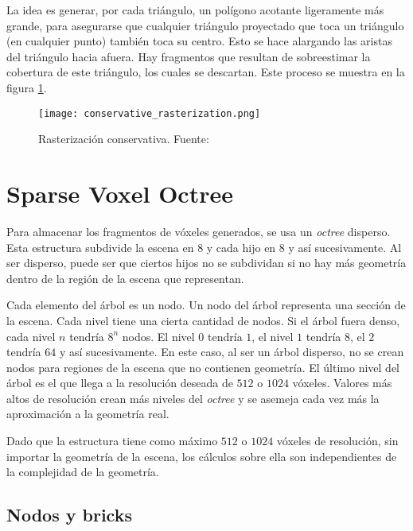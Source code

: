 La idea es generar, por cada triángulo, un polígono acotante ligeramente más grande, para asegurarse que cualquier triángulo proyectado que toca un triángulo (en cualquier punto) también toca su centro. %
Esto se hace alargando las aristas del triángulo hacia afuera.
Hay fragmentos que resultan de sobreestimar la cobertura de este triángulo, los cuales se descartan.
Este proceso se muestra en la figura \ref{fig:conservative_rasterization}.

\begin{figure}[h!]
    \centering
    \texttt{[image: conservative\_rasterization.png]}
    \caption{Rasterización conservativa. Fuente: \cite{opengl-insights}}
    \label{fig:conservative_rasterization}
\end{figure}

\section{Sparse Voxel Octree}

Para almacenar los fragmentos de vóxeles generados, se usa un \textit{octree} disperso.
Esta estructura subdivide la escena en $8$ y cada hijo en $8$ y así sucesivamente.
Al ser disperso, puede ser que ciertos hijos no se subdividan si no hay más geometría dentro de la región de la escena que representan.

Cada elemento del árbol es un nodo.
Un nodo del árbol representa una sección de la escena.
Cada nivel tiene una cierta cantidad de nodos.
Si el árbol fuera denso, cada nivel $n$ tendría $8^n$ nodos.
El nivel $0$ tendría $1$, el nivel $1$ tendría $8$, el $2$ tendría $64$ y así sucesivamente.
En este caso, al ser un árbol disperso, no se crean nodos para regiones de la escena que no contienen geometría.
El último nivel del árbol es el que llega a la resolución deseada de $512$ o $1024$ vóxeles.
Valores más altos de resolución crean más niveles del \textit{octree} y se asemeja cada vez más la aproximación a la geometría real.

Dado que la estructura tiene como máximo $512$ o $1024$ vóxeles de resolución, sin importar la geometría de la escena, los cálculos sobre ella son independientes de la complejidad de la geometría.

\subsection{Nodos y bricks}\label{sec:nodes_and_bricks}

